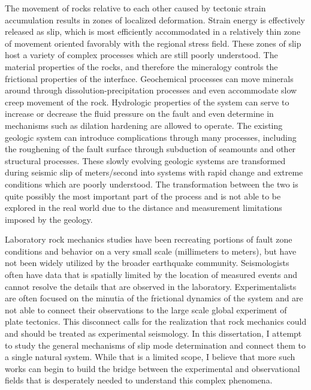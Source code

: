 The movement of rocks relative to each other caused by tectonic strain accumulation results in zones of localized deformation. Strain energy is effectively released as slip, which is most efficiently accommodated in a relatively thin zone of movement oriented favorably with the regional stress field. These zones of slip host a variety of complex processes which are still poorly understood. The material properties of the rocks, and therefore the mineralogy controls the frictional properties of the interface. Geochemical processes can move minerals around through dissolution-precipitation processes and even accommodate slow creep movement of the rock. Hydrologic properties of the system can serve to increase or decrease the fluid pressure on the fault and even determine in mechanisms such as dilation hardening are allowed to operate. The existing geologic system can introduce complications through many processes, including the roughening of the fault surface through subduction of seamounts and other structural processes. These slowly evolving geologic systems are transformed during seismic slip of meters/second into systems with rapid change and extreme conditions which are poorly understood. The transformation between the two is quite possibly the most important part of the process and is not able to be explored in the real world due to the distance and measurement limitations imposed by the geology.

Laboratory rock mechanics studies have been recreating portions of fault zone conditions and behavior on a very small scale (millimeters to meters), but have not been widely utilized by the broader earthquake community. Seismologists often have data that is spatially limited by the location of measured events and cannot resolve the details that are observed in the laboratory. Experimentalists are often focused on the minutia of the frictional dynamics of the system and are not able to connect their observations to the large scale global experiment of plate tectonics. This disconnect calls for the realization that rock mechanics could and should be treated as experimental seismology. In this dissertation, I attempt to study the general mechanisms of slip mode determination and connect them to a single natural system. While that is a limited scope, I believe that more such works can begin to build the bridge between the experimental and observational fields that is desperately needed to understand this complex phenomena.

